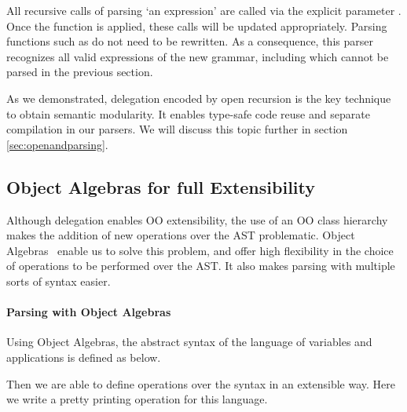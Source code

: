 
All recursive calls of parsing `an expression' are called via the explicit parameter . Once the  function is applied, these calls will be updated appropriately. Parsing functions such as  do not need to be rewritten. As a consequence, this parser recognizes all valid expressions of the new grammar, including   which cannot be parsed in the previous section.


As we demonstrated, delegation encoded by open recursion is the key technique to obtain semantic modularity. It enables type-safe code reuse and separate compilation in our parsers. We will discuss this topic further in section \ref{sec:openandparsing}.

\subsection{Object Algebras for full Extensibility}\label{subsec:overview-oa}

Although delegation enables OO extensibility, the use of an OO class
hierarchy makes the addition of new operations over the AST
problematic. Object Algebras~\cite{Oliveira2012} enable us to solve this problem, and
offer high flexibility in the choice of operations to be performed
over the AST. It also makes parsing with multiple sorts of syntax easier.

\paragraph{Parsing with Object Algebras} Using Object Algebras, the abstract syntax of the language of variables and applications is defined as below.


Then we are able to define operations over the syntax in an extensible way. Here we write a pretty printing operation for this language.


